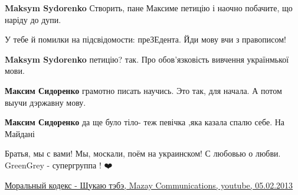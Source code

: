 \begin{itemize}
\begin{itemize}
\textbf{Maksym Sydorenko} Створить, пане Максиме петицію і наочно побачите, що наріду до дупи.

 
У тебе й помилки на підсвідомости: преЗЕдента. Йди мову вчи з правописом!

 
\textbf{Maksym Sydorenko} петицію?
так.
Про обов'язковість вивчення українмької мови.

 
\textbf{Максим Сидоренко} грамотно писать научись. Это так, для начала. А потом выучи дэржавну мову.

 
\textbf{Максим Сидоренко} да ще було тіло- теж певічка ,яка казала спалю себе. На Майдані


\end{itemize}

 

Братья, мы с вами! Мы, москали, поём на украинском! С любовью о любви.
GreenGrey - супергруппа ! ❤️

\href{https://www.youtube.com/watch?v=HGPYQHmvyfU}{%
Моральный кодекс - Шукаю тэбэ, Mazay Communications, youtube, 05.02.2013%
}

\begin{itemize}


\end{itemize}
\end{itemize}
